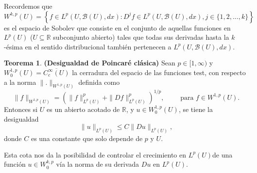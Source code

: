 \documentclass[letterpaper,twoside,12pt]{book}
\newcommand{\R}{\mathbb{R}}
\newcommand{\B}{\mathcal{B}}
\newcommand{\1}{\mathds{1}}
\theoremstyle{definition}
\theoremstyle{definition}
\newtheorem{teo}{Teorema}
\theoremstyle{remark}
\theoremstyle{definition}
\theoremstyle{definition}
\theoremstyle{definition}
\theoremstyle{definition}
\theoremstyle{definition}
\begin{document}
Recordemos que $W^{k,p}(U)=\left\{f\in L^{p}(U,\B(U),dx): D^jf\in L^p(U,\B(U),dx), j\in \{1,2,...,k\}\right\}$ es el espacio de Sobolev que consiste en el conjunto de aquellas funciones en $L^p(U)$ ($U\subseteq \R$ subconjunto abierto) tales que todas sus derivadas hasta la $k$-ésima en el sentido distribucional también pertenecen a $L^p(U,\B(U),dx)$.

\begin{teo}\textbf{(Desigualdad de Poincaré clásica)}
   Sean $p\in [1,\infty)$ y $W_0^{1,p}(U)=\overline{C^{\infty}_c(U)}$ la cerradura del espacio de las funciones test, con respecto a la norma $\|.\|_{W^{1,p}(U)}$ definida como
   \[
     \|f\|_{W^{1,p}(U)}=\left(\|f\|_{L^{p}(U)}^p+\|Df\|_{L^p(U)}^p\right)^{1/p}, \qquad \text{ para } f\in W^{1,p}(U).
    \]
   Entonces si $U$ es un abierto acotado de $\R$, y $u\in W_0^{1,p}(U)$, se tiene la desigualdad 
   \[
   \|u\|_{L^{p}(U)}\leq C\|Du\|_{L^p(U)},   
   \]
   donde $C$ es una constante que solo depende de $p$ y $U$. 
   \end{teo}
   Esta cota nos da la posibilidad de controlar el crecimiento en $L^p(U)$de una función $u\in W_0^{k,p}$ vía la norma de su derivada $Du$ en $L^p(U)$.
\end{document}
